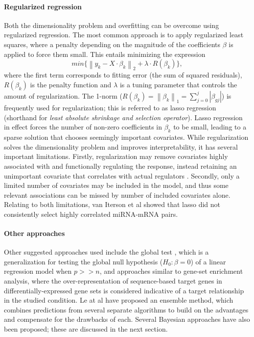 \paragraph{Regularized regression}
Both the dimensionality problem and overfitting can be overcome using regularized
regression. The most common approach is to apply regularized least squares,
where a penalty depending on the magnitude of the coefficients $\beta$
is applied to force them small. This entails minimizing the expression
\begin{equation}
	min\{ \left \| y_k - X \cdot \beta_k \right \|_2 + \lambda \cdot R(\beta_k) \} ,
\end{equation}
where the first term corresponds to fitting error (the sum of squared residuals),
$R(\beta_k)$ is the penalty function and $\lambda$ is a tuning
parameter that controls the amount of regularization. 
The 1-norm ($R(\beta_k) = \left \| \beta_k \right \|_1 = \sum_{j=0}^{j} \left | \beta_{gj} \right |$)
is frequently used for regularization; this is referred to as lasso regression
(shorthand for \emph{least absolute shrinkage and selection operator}).
Lasso regression in effect forces the number of non-zero coefficients in $\beta_k$
to be small, leading to a sparse solution that chooses seemingly important covariates.
While regularization solves the dimensionality problem and improves
interpretability, it has several important limitations. Firstly, regularization
may remove covariates highly associated with and functionally regulating the
response, instead retaining an unimportant covariate that correlates with
actual regulators \citep{Engelmann2012}. Secondly, only a limited number of
covariates may be included in the model, and thus some relevant associations
can be missed by number of included covariates alone. %
Relating to both limitations, van Iterson et al \citep{vanIterson2013} showed that
lasso did not consistently select highly correlated miRNA-mRNA pairs.

\paragraph{Other approaches}
Other suggested approaches used include the global test \citep{vanIterson2013}, which is a
generalization for testing the global null hypothesis ($H_0: \beta = 0$) of a
linear regression model when $p >> n$, and approaches
similar to gene-set enrichment analysis, where the over-representation of
sequence-based target genes in differentially-expressed gene sets is considered
indicative of a target relationship in the studied condition. Le at al \citep{Le2015}
have proposed an ensemble
method, which combines predictions from several separate algorithms to build
on the advantages and compensate for the drawbacks of each.
Several Bayesian approaches have also been proposed; these are discussed in
the next section.


